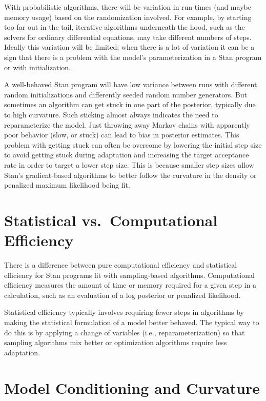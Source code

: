 With probabilistic algorithms, there will be variation in run times
(and maybe memory usage) based on the randomization involved.  For
example, by starting too far out in the tail, iterative algorithms
underneath the hood, such as the solvers for ordinary differential
equations, may take different numbers of steps.  Ideally this
variation will be limited;  when there is a lot of variation it can be
a sign that there is a problem with the model's parameterization in
a Stan program or with initialization.

A well-behaved Stan program will have low variance between runs with
different random initializations and differently seeded random number
generators.  But sometimes an algorithm can get stuck in one part of
the posterior, typically due to high curvature.  Such sticking almost
always indicates the need to reparameterize the model.  Just throwing
away Markov chains with apparently poor behavior (slow, or stuck) can
lead to bias in posterior estimates.  This problem with getting stuck
can often be overcome by lowering the initial step size to avoid
getting stuck during adaptation and increasing the target acceptance
rate in order to target a lower step size.  This is because smaller
step sizes allow Stan's gradient-based algorithms to better follow the
curvature in the density or penalized maximum likelihood being fit.

\section{Statistical vs.\  Computational Efficiency}

There is a difference between pure computational efficiency and
statistical efficiency for Stan programs fit with sampling-based
algorithms.  Computational efficiency measures the amount of time or
memory required for a given step in a calculation, such as an
evaluation of a log posterior or penalized likelihood.  

Statistical efficiency typically involves requiring fewer steps in
algorithms by making the statistical formulation of a model better
behaved.  The typical way to do this is by applying a change of
variables (i.e., reparameterization) so that sampling algorithms mix
better or optimization algorithms require less adaptation.

\section{Model Conditioning and Curvature}

